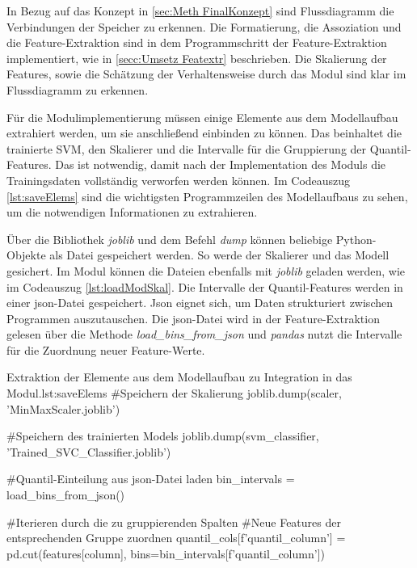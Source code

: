 
In Bezug auf das Konzept in \ref{sec:Meth FinalKonzept} sind Flussdiagramm die Verbindungen der Speicher zu erkennen. Die Formatierung, die Assoziation und die Feature-Extraktion sind in dem Programmschritt der Feature-Extraktion implementiert, wie in \ref{secc:Umsetz Featextr} beschrieben. Die Skalierung der Features, sowie die Schätzung der Verhaltensweise durch das Modul sind klar im Flussdiagramm zu erkennen. \par

Für die Modulimplementierung müssen einige Elemente aus dem Modellaufbau extrahiert werden, um sie anschließend einbinden zu können. Das beinhaltet die trainierte SVM, den Skalierer und die Intervalle für die Gruppierung der Quantil-Features. Das ist notwendig, damit nach der Implementation des Moduls die Trainingsdaten vollständig verworfen werden können. Im Codeauszug \ref{lst:saveElems} sind die wichtigsten Programmzeilen des Modellaufbaus zu sehen, um die notwendigen Informationen zu extrahieren.\par

Über die Bibliothek \textit{joblib} und dem Befehl \textit{dump} können beliebige Python-Objekte als Datei gespeichert werden. So werde der Skalierer und das Modell gesichert. Im Modul können die Dateien ebenfalls mit \textit{joblib} geladen werden, wie im Codeauszug \ref{lst:loadModSkal}. Die Intervalle der Quantil-Features werden in einer json-Datei gespeichert. Json eignet sich, um Daten strukturiert zwischen Programmen auszutauschen. Die json-Datei wird in der Feature-Extraktion gelesen über die Methode \textit{load\_bins\_from\_json} und \textit{pandas} nutzt die Intervalle für die Zuordnung neuer Feature-Werte.

\begin{pythoncode}{Extraktion der Elemente aus dem Modellaufbau zu Integration in das Modul.}{lst:saveElems}
#Speichern der Skalierung 
joblib.dump(scaler, 'MinMaxScaler.joblib')

#Speichern des trainierten Models
joblib.dump(svm_classifier, 'Trained_SVC_Classifier.joblib')


#Quantil-Einteilung aus json-Datei laden
bin_intervals = load_bins_from_json()

#Iterieren durch die zu gruppierenden Spalten
#Neue Features der entsprechenden Gruppe zuordnen 
quantil_cols[f'quantil_{column}'] = pd.cut(features[column], 
                                       bins=bin_intervals[f'quantil_{column}'])
\end{pythoncode}                                       

